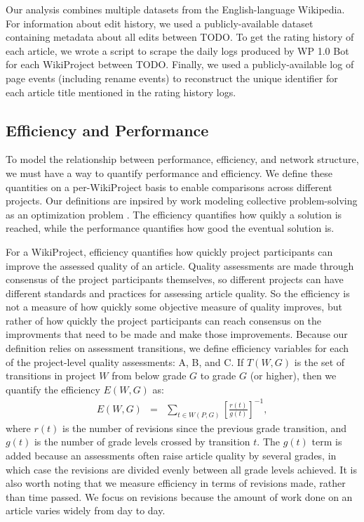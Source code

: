 \documentclass[10pt,twocolumn]{article}
\newcommand{\beq}{\begin{eqnarray}}
\newcommand{\eeq}{\end{eqnarray}}
\newcommand{\+}{\phantom{-}}
\begin{document}
Our analysis combines multiple datasets from the English-language Wikipedia.
For information about edit history, we used a publicly-available dataset containing
metadata about all edits between TODO.
To get the rating history of each article,
we wrote a script to scrape the daily logs produced by WP 1.0 Bot for each WikiProject
between TODO.
Finally, we used a publicly-available log of page events (including rename events)
to reconstruct the unique identifier for each article title mentioned in the rating history logs.

\subsection{Efficiency and Performance}

To model the relationship between performance, efficiency, and network structure,
we must have a way to quantify performance and efficiency.
We define these quantities on a per-WikiProject basis to enable comparisons across different
projects.
Our definitions are inpsired by work modeling collective problem-solving as an optimization
problem \cite{lazer_network_2007, mason_propagation_2008, mason_collaborative_2012,
grim_scientific_2013, barkoczi_social_2016}.
The efficiency quantifies how quikly a solution is reached,
while the performance quantifies how good the eventual solution is.

For a WikiProject, efficiency quantifies how quickly project participants can improve the
assessed quality of an article.
Quality assessments are made through consensus of the project participants themselves,
so different projects can have different standards and practices for assessing article quality.
So the efficiency is not a measure of how quickly some objective measure of quality improves,
but rather of how quickly the project participants can reach consensus on the improvments that
need to be made and make those improvements.
Because our definition relies on assessment transitions, we define efficiency variables for
each of the project-level quality assessments: A, B, and C.
If $T(W,G)$ is the set of transitions in project $W$ from below grade $G$ to grade $G$ (or higher),
then we quantify the efficiency $E(W,G)$ as:
\beq
E(W,G) &=& \sum_{t \in W(P,G)} \left[ \frac{r(t)}{g(t)} \right]^{-1},
\eeq
where $r(t)$ is the number of revisions since the previous grade transition,
and $g(t)$ is the number of grade levels crossed by transition $t$.
The $g(t)$ term is added because an assessments often raise article quality by several
grades, in which case the revisions are divided evenly between all grade levels achieved.
It is also worth noting that we measure efficiency in terms of revisions made,
rather than time passed.
We focus on revisions because the amount of work done on an article varies widely from day to day.
\end{document}

